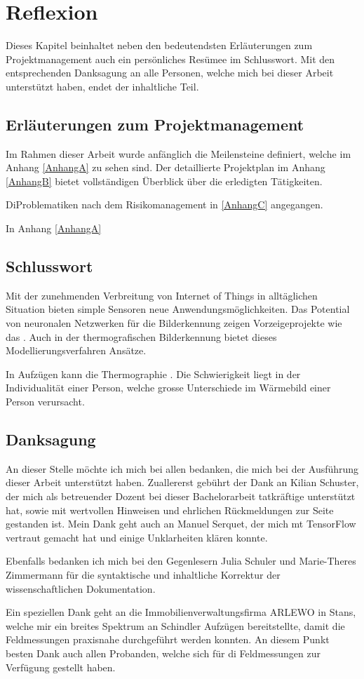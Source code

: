 \chapter{Reflexion}
\label{chap:Reflexion}

Dieses Kapitel beinhaltet neben den bedeutendsten Erläuterungen zum Projektmanagement auch ein persönliches Resümee im Schlusswort. Mit den entsprechenden Danksagung an alle Personen, welche mich bei dieser Arbeit unterstützt haben, endet der inhaltliche Teil.


\section{Erläuterungen zum Projektmanagement}
Im Rahmen dieser Arbeit wurde anfänglich die Meilensteine definiert, welche im Anhang \ref{AnhangA} zu sehen sind. Der detaillierte Projektplan im Anhang \ref{AnhangB} bietet vollständigen Überblick über die erledigten Tätigkeiten. 


DiProblematiken nach dem Risikomanagement in \ref{AnhangC} angegangen.

In Anhang \ref{AnhangA}


\section{Schlusswort}

Mit der zunehmenden Verbreitung von Internet of Things in alltäglichen Situation bieten simple Sensoren neue Anwendungsmöglichkeiten. Das Potential von neuronalen Netzwerken für die Bilderkennung zeigen Vorzeigeprojekte wie das . Auch in der thermografischen Bilderkennung bietet dieses Modellierungsverfahren Ansätze. 

In Aufzügen kann die Thermographie . Die Schwierigkeit liegt in der Individualität einer Person, welche grosse Unterschiede im Wärmebild einer Person verursacht.   



\section{Danksagung}

An dieser Stelle möchte ich mich bei allen bedanken, die mich bei der Ausführung dieser
Arbeit unterstützt haben. 
Zuallererst gebührt der Dank an Kilian Schuster, der mich als betreuender Dozent bei dieser Bachelorarbeit tatkräftige unterstützt hat, sowie mit wertvollen Hinweisen und ehrlichen Rückmeldungen zur Seite gestanden ist. Mein Dank geht auch an Manuel Serquet, der mich mt TensorFlow vertraut gemacht hat und einige Unklarheiten klären konnte. 

Ebenfalls bedanken ich mich bei den Gegenlesern Julia Schuler und Marie-Theres Zimmermann für die syntaktische und inhaltliche Korrektur der wissenschaftlichen Dokumentation.

Ein speziellen Dank geht an die Immobilienverwaltungsfirma ARLEWO in Stans, welche mir ein breites Spektrum an Schindler Aufzügen bereitstellte, damit die Feldmessungen praxisnahe durchgeführt werden konnten. An diesem Punkt besten Dank auch allen Probanden, welche sich für di Feldmessungen zur Verfügung gestellt haben.